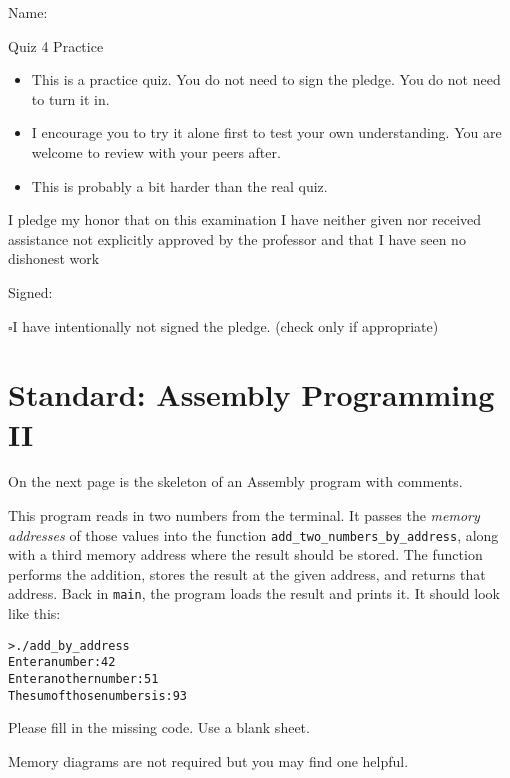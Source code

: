 \documentclass[12pt]{article}
\begin{document}
Name: \makebox[3in]{\hrulefill}

\vfill

\begin{center}
{\huge Quiz 4 Practice}
\end{center}

\begin{itemize}
    \item This is a practice quiz. You do not need to sign the pledge. You do not need to turn it in. 
    \item I encourage you to try it alone first to test your own understanding. You are welcome to review with your peers after.
    \item This is probably a bit harder than the real quiz.
\end{itemize}

\vfill

I pledge my honor that on this examination I have neither given nor received assistance not explicitly approved by the professor and that I have seen no dishonest work 

\hfill Signed: \makebox[3in]{\hrulefill}

$\square$\quad I have intentionally not signed the pledge. (check only if appropriate)
\newpage

\section*{Standard: Assembly Programming II}

On the next page is the skeleton of an Assembly program with comments. 

This program reads in two numbers from the terminal. It passes the \textit{memory addresses} of those values into the function \texttt{add\_two\_numbers\_by\_address}, along with a third memory address where the result should be stored. The function performs the addition, stores the result at the given address, and returns that address. Back in \texttt{main}, the program loads the result and prints it. It should look like this:

\begin{alltt}
    > ./add_by_address
    Enter a number: 42
    Enter another number: 51
    The sum of those numbers is: 93
\end{alltt}

Please fill in the missing code. Use a blank sheet.

Memory diagrams are not required but you may find one helpful.
\end{document}
